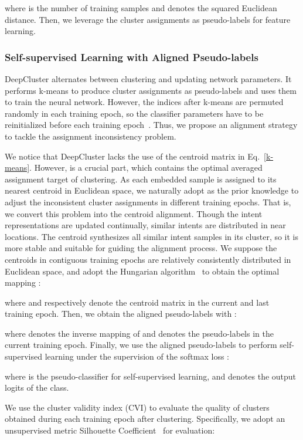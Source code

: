 \documentclass[letterpaper]{article} \usepackage{aaai21}  \usepackage{times}  \usepackage{helvet} \usepackage{courier}  \usepackage[hyphens]{url}  \usepackage{graphicx} \urlstyle{rm} \def\UrlFont{\rm}  \usepackage{natbib}  \usepackage{caption} \frenchspacing  \setlength{\pdfpagewidth}{8.5in}  \setlength{\pdfpageheight}{11in}  \usepackage{amsmath}
\begin{document}
	where  is the number of training samples and   denotes the squared Euclidean distance. Then, we leverage the cluster assignments as pseudo-labels for feature learning. 
	
	\subsubsection{Self-supervised Learning with Aligned Pseudo-labels}
	DeepCluster alternates between clustering and updating network parameters. It performs k-means to produce cluster assignments as pseudo-labels and uses them to train the neural network. However, the indices after k-means are permuted randomly in each training epoch, so the classifier parameters have to be reinitialized before each training epoch~\cite{Zhan_2020_CVPR}. Thus, we propose an alignment strategy to tackle the assignment inconsistency problem.
	
	We notice that DeepCluster lacks the use of the centroid matrix  in Eq.~\ref{k-means}. However,  is a crucial part, which contains the optimal averaged assignment target of clustering. As each embedded sample is assigned to its nearest centroid in Euclidean space, we naturally adopt  as the prior knowledge to adjust the inconsistent cluster assignments in different training epochs. That is, we convert this problem into the centroid alignment. Though the intent representations are updated continually, similar intents are distributed in near locations. The centroid synthesizes all similar intent samples in its cluster, so it is more stable and suitable for guiding the alignment process. We suppose the centroids in contiguous training epochs are relatively consistently distributed in Euclidean space, and adopt the Hungarian algorithm~\cite{kuhn1955hungarian} to obtain the optimal mapping :
	
	where  and  respectively denote the centroid matrix in the current and last training epoch. Then, we obtain the aligned pseudo-labels  with :
	
	where  denotes the inverse mapping of  and  denotes the pseudo-labels in the current training epoch. Finally, we use the aligned pseudo-labels to perform self-supervised learning under the supervision of the softmax loss :
	
	where  is the pseudo-classifier for self-supervised learning, and  denotes the output logits of the  class.
	
	We use the cluster validity index (CVI) to evaluate the quality of clusters obtained during each training epoch after clustering. Specifically, we adopt an unsupervised metric Silhouette Coefficient~\cite{ROUSSEEUW198753} for evaluation:
	
\end{document}
